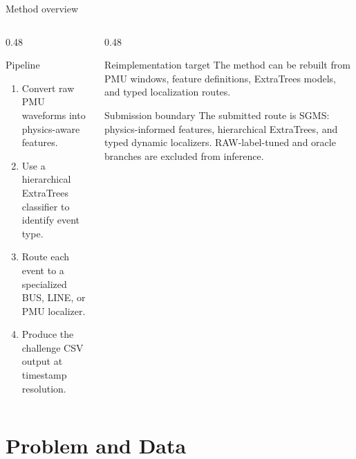 ﻿\documentclass[10pt,aspectratio=169]{beamer}
\begin{document}
\begin{frame}{Method overview}
\small
\begin{columns}[T,totalwidth=\textwidth]
\begin{column}{0.48\textwidth}
\begin{block}{Pipeline}
\begin{enumerate}
  \item Convert raw PMU waveforms into physics-aware features.
  \item Use a hierarchical ExtraTrees classifier to identify event type.
  \item Route each event to a specialized BUS, LINE, or PMU localizer.
  \item Produce the challenge CSV output at timestamp resolution.
\end{enumerate}
\end{block}
\end{column}
\begin{column}{0.48\textwidth}
\begin{exampleblock}{Reimplementation target}
The method can be rebuilt from PMU windows, feature definitions, ExtraTrees models, and typed localization routes.
\end{exampleblock}
\begin{alertblock}{Submission boundary}
The submitted route is SGMS: physics-informed features, hierarchical ExtraTrees, and typed dynamic localizers. RAW-label-tuned and oracle branches are excluded from inference.
\end{alertblock}
\end{column}
\end{columns}
\end{frame}


\section{Problem and Data}
\end{document}
